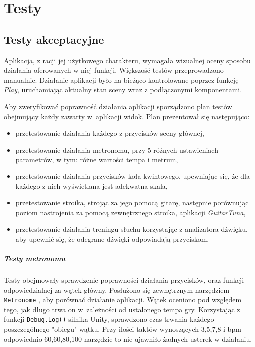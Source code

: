 \chapter{Testy}
\section{Testy akceptacyjne}
Aplikacja, z racji jej użytkowego charakteru, wymagała wizualnej oceny sposobu działania oferowanych w niej funkcji. Większość testów przeprowadzono manualnie. Działanie aplikacji było na bieżąco kontrolowane poprzez funkcję \emph{Play}, uruchamiając aktualny stan sceny wraz z podłączonymi komponentami.

Aby zweryfikować poprawność działania aplikacji sporządzono plan testów obejmujący każdy zawarty w~aplikacji widok. Plan prezentował się następująco:
\begin{itemize}
    \item przetestowanie działania każdego z przycisków sceny głównej,
    \item przetestowanie działania metronomu, przy 5 różnych ustawieniach parametrów, w tym: różne wartości tempa i metrum,
    \item przetestowanie działania przycisków koła kwintowego, upewniając się, że dla każdego z nich wyświetlana jest adekwatna skala,
    \item przetestowanie stroika, strojąc za jego pomocą gitarę, następnie porównując poziom nastrojenia za pomocą zewnętrznego stroika, aplikacji \emph{GuitarTuna},
    \item przetestowanie działania treningu słuchu korzystając z analizatora dźwięku, aby upewnić się, że odegrane dźwięki odpowiadają przyciskom.
\end{itemize} 

\paragraph{Testy metronomu}

Testy obejmowały sprawdzenie poprawności działania przycisków, oraz funkcji odpowiedzialnej za wątek główny. Posłużono się zewnętrznym narzędziem \texttt{Metronome} \cite{Musicca}, aby porównać działanie aplikacji. Wątek oceniono pod względem tego, jak długo trwa on w~zależności od ustalonego tempa gry. Korzystając z funkcji \texttt{Debug.Log()} silnika Unity, sprawdzono czas trwania każdego poszczególnego "obiegu" wątku. Przy ilości taktów wynoszących 3,5,7,8 i bpm odpowiednio 60,60,80,100 narzędzie to nie ujawniło żadnych usterek w działaniu.


